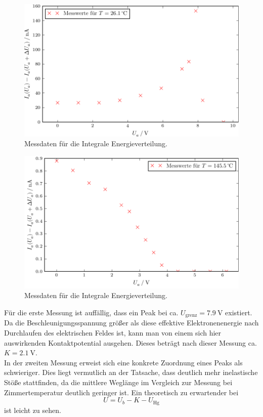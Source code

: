 


\begin{figure}
  \centering
  \includegraphics{build/aufgabenteil_a_plot.pdf}
  \caption{Messdaten für die Integrale Energieverteilung.}
  \label{fig:plot1}
\end{figure}

\begin{figure}
  \centering
  \includegraphics{build/aufgabenteil_a_plot_2.pdf}
  \caption{Messdaten für die Integrale Energieverteilung.}
  \label{fig:plot2}
\end{figure}

Für die erste Messung ist auffällig, dass ein Peak bei ca. $U_{\text{grenz}} = \SI{7.9}{\volt}$ existiert.
Da die Beschleunigungsspannung größer als diese effektive Elektronenenergie nach Durchlaufen des elektrischen Feldes ist, kann man von einem sich hier auswirkenden Kontaktpotential ausgehen.
Dieses beträgt nach dieser Messung ca. $K = \SI{2.1}{\volt}$.\\
In der zweiten Messung erweist sich eine konkrete Zuordnung eines Peaks als schwieriger.
Dies liegt vermutlich an der Tatsache, dass deutlich mehr inelastische Stöße stattfinden, da die mittlere Weglänge im Vergleich zur Messung bei Zimmertemperatur deutlich geringer ist.
Ein theoretisch zu erwartender bei
\begin{equation}
  U = U_b - K - U_{\text{Hg}}
\end{equation}
ist leicht zu sehen. %
